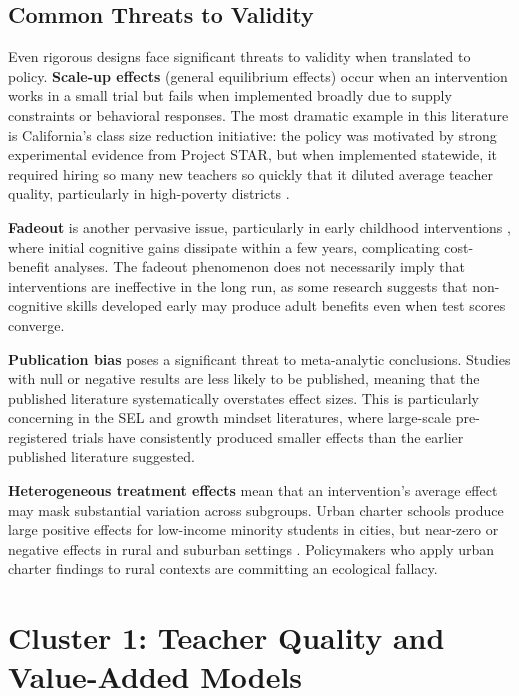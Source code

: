 \documentclass[12pt,letterpaper]{article}
\begin{document}
\subsection{Common Threats to Validity}

Even rigorous designs face significant threats to validity when translated to policy. \textbf{Scale-up effects} (general equilibrium effects) occur when an intervention works in a small trial but fails when implemented broadly due to supply constraints or behavioral responses. The most dramatic example in this literature is California's class size reduction initiative: the policy was motivated by strong experimental evidence from Project STAR, but when implemented statewide, it required hiring so many new teachers so quickly that it diluted average teacher quality, particularly in high-poverty districts \citep{jepsen2009}.

\textbf{Fadeout} is another pervasive issue, particularly in early childhood interventions \citep{puma2010}, where initial cognitive gains dissipate within a few years, complicating cost-benefit analyses. The fadeout phenomenon does not necessarily imply that interventions are ineffective in the long run, as some research suggests that non-cognitive skills developed early may produce adult benefits even when test scores converge.

\textbf{Publication bias} poses a significant threat to meta-analytic conclusions. Studies with null or negative results are less likely to be published, meaning that the published literature systematically overstates effect sizes. This is particularly concerning in the SEL and growth mindset literatures, where large-scale pre-registered trials have consistently produced smaller effects than the earlier published literature suggested.

\textbf{Heterogeneous treatment effects} mean that an intervention's average effect may mask substantial variation across subgroups. Urban charter schools produce large positive effects for low-income minority students in cities, but near-zero or negative effects in rural and suburban settings . Policymakers who apply urban charter findings to rural contexts are committing an ecological fallacy.

\section{Cluster 1: Teacher Quality and Value-Added Models}
\end{document}

